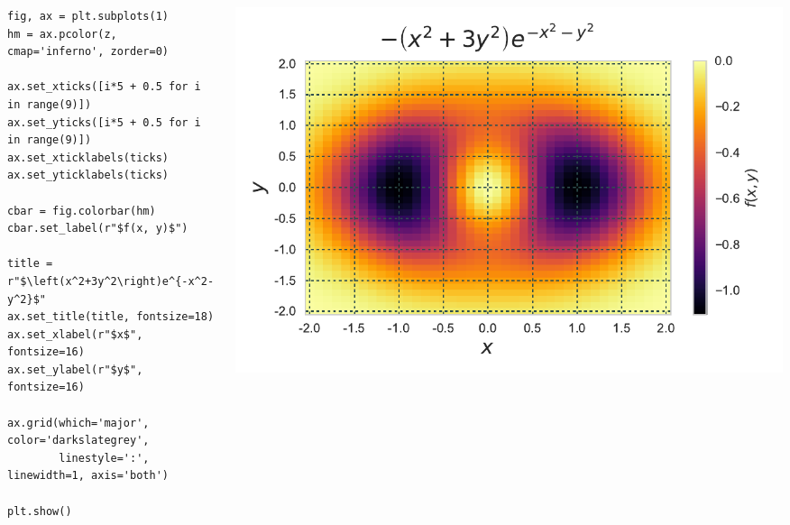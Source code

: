 \documentclass{beamer}
\begin{document}
\begin{frame}[fragile]
\tiny{
\begin{columns}
\begin{column}{0.45\textwidth}
\begin{verbatim}
fig, ax = plt.subplots(1)
hm = ax.pcolor(z, cmap='inferno', zorder=0)

ax.set_xticks([i*5 + 0.5 for i in range(9)])
ax.set_yticks([i*5 + 0.5 for i in range(9)])
ax.set_xticklabels(ticks)
ax.set_yticklabels(ticks)

cbar = fig.colorbar(hm)
cbar.set_label(r"$f(x, y)$")

title = r"$\left(x^2+3y^2\right)e^{-x^2-y^2}$"
ax.set_title(title, fontsize=18)
ax.set_xlabel(r"$x$", fontsize=16)
ax.set_ylabel(r"$y$", fontsize=16)

ax.grid(which='major', color='darkslategrey',
        linestyle=':', linewidth=1, axis='both')

plt.show()
\end{verbatim}
\end{column}
\begin{column}{0.55\textwidth}
\includegraphics[width=\textwidth]{../heatmap_7.pdf}
\end{column}
\end{columns}
}
\end{frame}
\end{document}
